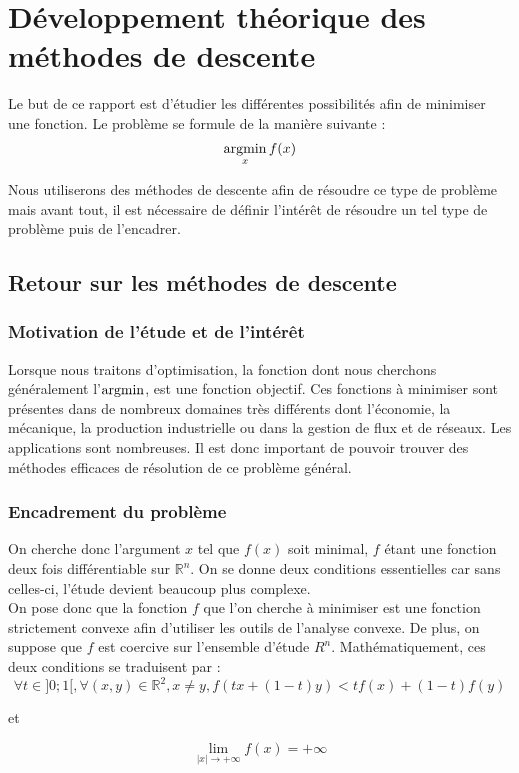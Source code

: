 \chapter{Développement théorique des méthodes de descente}

Le but de ce rapport est d'étudier les différentes possibilités afin de minimiser une fonction. Le problème se formule de la manière suivante : 
\begin{equation}
\argmin_x f(x)
\end{equation}

Nous utiliserons des méthodes de descente afin de résoudre ce type de problème mais avant tout, il est nécessaire de définir l'intérêt de résoudre un tel type de problème puis de l'encadrer.

\section{Retour sur les méthodes de descente}
\subsection{Motivation de l'étude et de l'intérêt}
Lorsque nous traitons d'optimisation, la fonction dont nous cherchons généralement l'$\argmin$, est une fonction objectif. Ces fonctions à minimiser sont présentes dans de nombreux domaines très différents dont l'économie, la mécanique, la production industrielle ou dans la gestion de flux et de réseaux. Les applications sont nombreuses. Il est donc important de pouvoir trouver des méthodes efficaces de résolution de ce problème général. 
\subsection{Encadrement du problème}
On cherche donc l'argument $x$ tel que $f(x)$ soit minimal, $f$ étant une fonction deux fois différentiable sur $\mathbb{R}^n$. On se donne deux conditions essentielles car sans celles-ci, l'étude devient beaucoup plus complexe. \\

On pose donc que la fonction $f$ que l'on cherche à minimiser est une fonction strictement convexe afin d'utiliser les outils de l'analyse convexe. De plus, on suppose que $f$ est coercive sur l'ensemble d'étude $R^n$. Mathématiquement, ces deux conditions se traduisent par :
$$
\forall t \in ]0;1[, \forall (x,y) \in \mathbb{R}^2, x\neq y, f(tx+(1-t)y)<tf(x)+(1-t)f(y) 
$$
\begin{center}
	et
\end{center}
$$
\lim\limits_{|x|\rightarrow +\infty}f(x)=+\infty
$$

